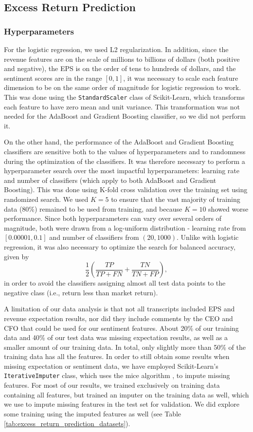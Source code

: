 \documentclass{article}
\begin{document}
\subsection{Excess Return Prediction}
\label{excess_return_prediction}
\subsubsection{Hyperparameters}

For the logistic regression, we used L2 regularization.
In addition, since the revenue features are on the scale of millions to billions of dollars (both positive and negative), the EPS is on the order of tens to hundreds of dollars, and the sentiment scores are in the range $[0,1]$, it was necessary to scale each feature dimension to be on the same order of magnitude for logistic regression to work.
This was done using the \texttt{StandardScaler} class of Scikit-Learn, which transforms each feature to have zero mean and unit variance.
This transformation was not needed for the AdaBoost and Gradient Boosting classifier, so we did not perform it.

On the other hand, the performance of the AdaBoost and Gradient Boosting classifiers are sensitive both to the values of hyperparameters and to randomness during the optimization of the classifiers.
It was therefore necessary to perform a hyperparameter search over the most impactful hyperparameters: learning rate and number of classifiers (which apply to both AdaBoost and Gradient Boosting).
This was done using K-fold cross validation over the training set using randomized search.
We used $K=5$ to ensure that the vast majority of training data (80\%) remained to be used from training, and because $K=10$ showed worse performance.
Since both hyperparameters can vary over several orders of magnitude, both were drawn from a log-uniform distribution - learning rate from $[0.00001, 0.1]$ and number of classifiers from $(20, 1000)$.
Unlike with logistic regression, it was also necessary to optimize the search for balanced accuracy, given by \[\frac{1}{2}\left(\frac{TP}{TP+FN} + \frac{TN}{TN+FP}\right),\] in order to avoid the classifiers assigning almost all test data points to the negative class (i.e., return less than market return).

A limitation of our data analysis is that not all transcripts included EPS and revenue expectation results,
nor did they include comments by the CEO and CFO that could be used for our sentiment features.
About 20\% of our training data and 40\% of our test data was missing expectation results,
as well as a smaller amount of our training data.
In total, only slightly more than 50\% of the training data has all the features.
In order to still obtain some results when missing expectation or sentiment data, we have employed Scikit-Learn's \texttt{IterativeImputer} class, which uses the mice algorithm \citep{JSSv045i03}, to impute missing features.
For most of our results, we trained exclusively on training data containing all features, but trained an imputer on the training data as well, which we use to impute missing features in the test set for validation.
We did explore some training using the imputed features as well (see Table \ref{tab:excess_return_prediction_datasets}).
\end{document}
